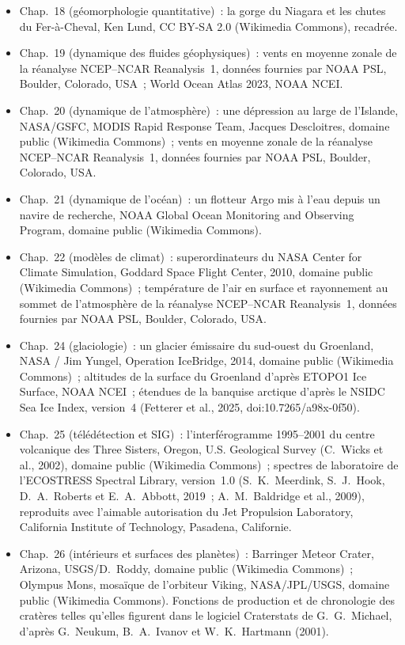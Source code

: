 \begin{itemize}
  \item Chap.~18 (géomorphologie quantitative)~: la gorge du Niagara et les chutes du Fer-à-Cheval, Ken Lund, CC BY-SA 2.0 (Wikimedia Commons), recadrée.
  \item Chap.~19 (dynamique des fluides géophysiques)~: vents en moyenne zonale de la réanalyse NCEP--NCAR Reanalysis~1, données fournies par NOAA PSL, Boulder, Colorado, USA~; World Ocean Atlas 2023, NOAA NCEI.
  \item Chap.~20 (dynamique de l'atmosphère)~: une dépression au large de l'Islande, NASA/GSFC, MODIS Rapid Response Team, Jacques Descloitres, domaine public (Wikimedia Commons)~; vents en moyenne zonale de la réanalyse NCEP--NCAR Reanalysis~1, données fournies par NOAA PSL, Boulder, Colorado, USA.
  \item Chap.~21 (dynamique de l'océan)~: un flotteur Argo mis à l'eau depuis un navire de recherche, NOAA Global Ocean Monitoring and Observing Program, domaine public (Wikimedia Commons).
  \item Chap.~22 (modèles de climat)~: superordinateurs du NASA Center for Climate Simulation, Goddard Space Flight Center, 2010, domaine public (Wikimedia Commons)~; température de l'air en surface et rayonnement au sommet de l'atmosphère de la réanalyse NCEP--NCAR Reanalysis~1, données fournies par NOAA PSL, Boulder, Colorado, USA.
  \item Chap.~24 (glaciologie)~: un glacier émissaire du sud-ouest du Groenland, NASA / Jim Yungel, Operation IceBridge, 2014, domaine public (Wikimedia Commons)~; altitudes de la surface du Groenland d'après ETOPO1 Ice Surface, NOAA NCEI~; étendues de la banquise arctique d'après le NSIDC Sea Ice Index, version~4 (Fetterer et al., 2025, doi:10.7265/a98x-0f50).
  \item Chap.~25 (télédétection et SIG)~: l'interférogramme 1995--2001 du centre volcanique des Three Sisters, Oregon, U.S. Geological Survey (C.~Wicks et al., 2002), domaine public (Wikimedia Commons)~; spectres de laboratoire de l'ECOSTRESS Spectral Library, version~1.0 (S.~K.~Meerdink, S.~J.~Hook, D.~A.~Roberts et E.~A.~Abbott, 2019~; A.~M.~Baldridge et al., 2009), reproduits avec l'aimable autorisation du Jet Propulsion Laboratory, California Institute of Technology, Pasadena, Californie.
  \item Chap.~26 (intérieurs et surfaces des planètes)~: Barringer Meteor Crater, Arizona, USGS/D.~Roddy, domaine public (Wikimedia Commons)~; Olympus Mons, mosaïque de l'orbiteur Viking, NASA/JPL/USGS, domaine public (Wikimedia Commons). Fonctions de production et de chronologie des cratères telles qu'elles figurent dans le logiciel Craterstats de G.~G.~Michael, d'après G.~Neukum, B.~A.~Ivanov et W.~K.~Hartmann (2001).

\end{itemize}
